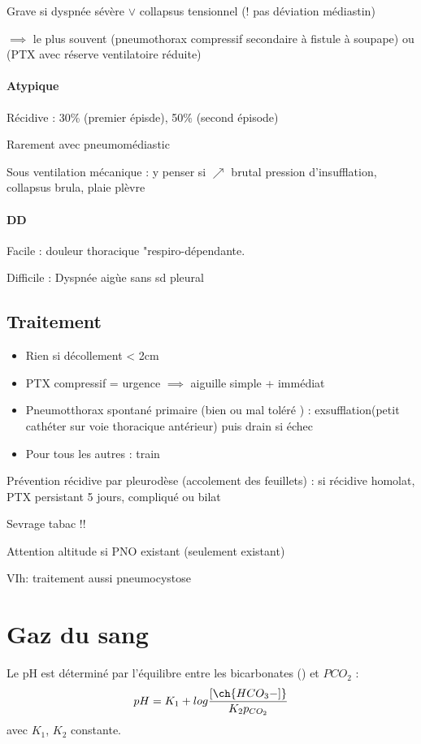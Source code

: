 Grave si dyspnée sévère $\vee$ collapsus tensionnel (! pas déviation médiastin) 

$\implies$ le plus souvent (pneumothorax compressif secondaire à fistule à
soupape) ou (PTX avec réserve ventilatoire réduite)

\paragraph{Atypique}
Récidive : 30\% (premier épisde), 50\% (second épisode)

Rarement avec pneumomédiastic

Sous ventilation mécanique : y penser si $\nearrow$ brutal pression
d'insufflation, collapsus brula, plaie plèvre

\paragraph{DD}
Facile : douleur thoracique "respiro-dépendante.

Difficile : Dyspnée aigùe sans sd pleural 

\subsection{Traitement}
\begin{itemize}
  \item Rien si décollement < 2cm
  \item PTX compressif = urgence $\implies$ aiguille simple + immédiat
  \item Pneumotthorax spontané primaire (bien ou mal toléré ) :
    exsufflation(petit cathéter sur voie thoracique antérieur) puis drain
si échec
\item Pour tous les autres : train
\end{itemize}

Prévention récidive par pleurodèse (accolement des feuillets) : si récidive
homolat, PTX persistant 5 jours, compliqué ou bilat

Sevrage tabac !!

Attention altitude si PNO existant (seulement existant)

VIh: traitement aussi pneumocystose


\section{Gaz du sang}
\label{appendix:gds}
Le pH est déterminé par l'équilibre entre les bicarbonates () et
$PCO_2$ :
\begin{equation}
  pH = K_1 + log\frac{[\ch{HCO_3-]}}{K_2 p_{CO_2}}
\end{equation}
avec $K_1$, $K_2$ constante.

